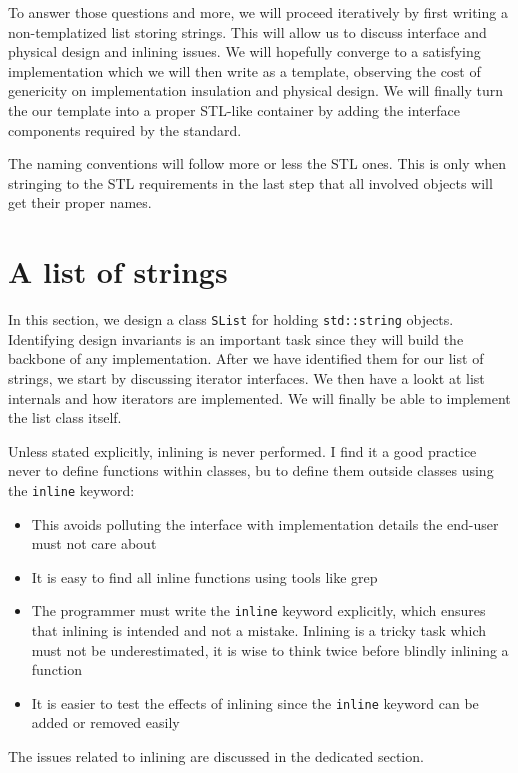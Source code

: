 To answer those questions and more, we will proceed iteratively by first writing a non-templatized list storing strings. This will allow us to discuss interface and physical design and inlining issues. We will hopefully converge to a satisfying implementation which we will then write as a template, observing the cost of genericity on implementation insulation and physical design. We will finally turn the our template into a proper STL-like container by adding the interface components required by the standard.

The naming conventions will follow more or less the STL ones. This is only when stringing to the STL requirements in the last step that all involved objects will get their proper names.

\section{A list of strings}
In this section, we design a class \lstinline!SList! for holding \lstinline!std::string! objects. Identifying design invariants is an important task since they will build the backbone of any implementation. After we have identified them for our list of strings, we start by discussing iterator interfaces. We then have a lookt at list internals and how iterators are implemented. We will finally be able to implement the list class itself.

Unless stated explicitly, inlining is never performed. I find it a good practice never to define functions within classes, bu to define them outside classes using the \lstinline!inline! keyword:
\begin{itemize}
\item This avoids polluting the interface with implementation details the end-user must not care about
\item It is easy to find all inline functions using tools like grep
\item The programmer must write the \lstinline!inline! keyword explicitly, which ensures that inlining is intended and not a mistake. Inlining is a tricky task which must not be underestimated, it is wise to think twice before blindly inlining a function
\item It is easier to test the effects of inlining since the \lstinline!inline! keyword can be added or removed easily
\end{itemize}
The issues related to inlining are discussed in the dedicated section.

